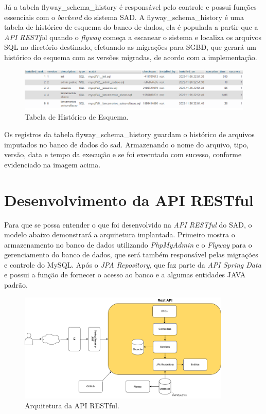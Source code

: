     Já a tabela flyway\_schema\_history é responsável pelo controle e possui funções essenciais com o \textit{backend} do sistema SAD. A flyway\_schema\_history é uma tabela de histórico de esquema do banco de dados, ela é populada a partir que a \textit{API RESTfu}l quando o \textit{flyway} começa a escanear o sistema e localiza os arquivos SQL no diretório destinado, efetuando as migrações para SGBD, que gerará um histórico do esquema com as versões migradas, de acordo com a implementação.
        
    \begin{figure}[h]
    \centering
    \includegraphics[width=1.0\textwidth]{./img/FlywaySchema.png}
    \caption{Tabela de Histórico de Esquema.}
    \label{fig:ModeloFisico}
    \end{figure}
    
    Os registros da tabela flyway\_schema\_history guardam o histórico de arquivos imputados no banco de dados do sad. Armazenando o nome do arquivo, tipo, versão, data e tempo da execução e se foi executado com sucesso, conforme evidenciado na imagem acima. 

    
\section{Desenvolvimento da API RESTful}

    Para que se possa entender o que foi desenvolvido na \textit{API RESTful} do SAD, o modelo abaixo demonstrará a arquitetura implantada. Primeiro mostra o armazenamento no banco de dados utilizando \textit{PhpMyAdmin} e o \textit{Flyway} para o gerenciamento do banco de dados, que será também responsável pelas migrações e controle do MySQL. Após o \textit{JPA Repository}, que faz parte da \textit{API Spring Data} e possui a função de fornecer o acesso ao banco e a algumas entidades JAVA padrão.
  
    \begin{figure}[h]
    \centering
    \includegraphics[width=0.90\textwidth]{./img/ArquiteturaRESTAPI .png}
    \caption{Arquitetura da API RESTful.}
    \label{fig:Arquitetura}
    \end{figure}
    
